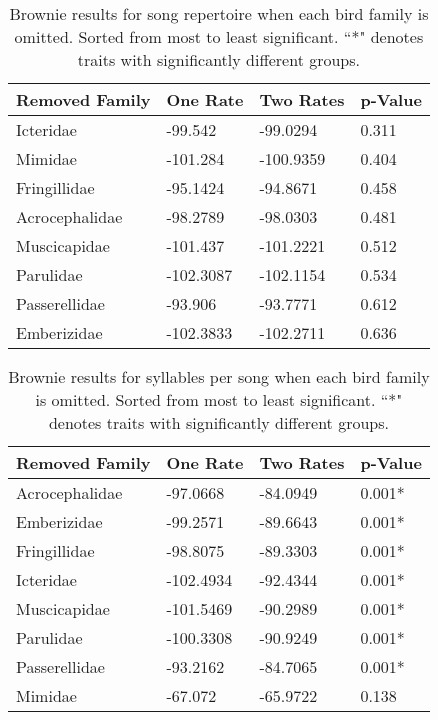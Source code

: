\documentclass[a4paper,12pt]{article}
\begin{document}
\begin{table}[ht]
\caption{Brownie results for song repertoire when each bird family is omitted.  Sorted from most to least significant.  ``*" denotes traits with significantly different groups.}
\centering
\begin{tabular}{llll}
  \hline
Removed Family & One Rate & Two Rates & p-Value \\ 
  \hline
Icteridae & -99.542 & -99.0294 & 0.311 \\ 
  Mimidae & -101.284 & -100.9359 & 0.404 \\ 
  Fringillidae & -95.1424 & -94.8671 & 0.458 \\ 
  Acrocephalidae & -98.2789 & -98.0303 & 0.481 \\ 
  Muscicapidae & -101.437 & -101.2221 & 0.512 \\ 
  Parulidae & -102.3087 & -102.1154 & 0.534 \\ 
  Passerellidae & -93.906 & -93.7771 & 0.612 \\ 
  Emberizidae & -102.3833 & -102.2711 & 0.636 \\ 
   \hline
\end{tabular}
\end{table}

\begin{table}[ht]
\caption{Brownie results for syllables per song when each bird family is omitted.  Sorted from most to least significant.  ``*" denotes traits with significantly different groups.}
\centering
\begin{tabular}{llll}
  \hline
Removed Family & One Rate & Two Rates & p-Value \\ 
  \hline
Acrocephalidae & -97.0668 & -84.0949 & 0.001* \\ 
  Emberizidae & -99.2571 & -89.6643 & 0.001* \\ 
  Fringillidae & -98.8075 & -89.3303 & 0.001* \\ 
  Icteridae & -102.4934 & -92.4344 & 0.001* \\ 
  Muscicapidae & -101.5469 & -90.2989 & 0.001* \\ 
  Parulidae & -100.3308 & -90.9249 & 0.001* \\ 
  Passerellidae & -93.2162 & -84.7065 & 0.001* \\ 
  Mimidae & -67.072 & -65.9722 & 0.138 \\ 
   \hline
\end{tabular}
\end{table}
\end{document}
